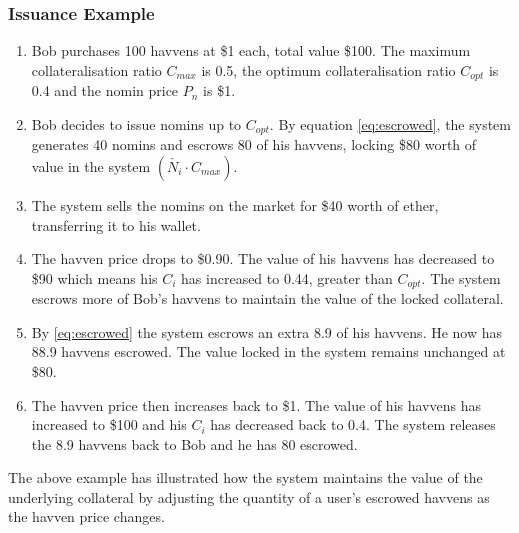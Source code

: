 \subsubsection{Issuance Example}

\begin{enumerate}
\item{Bob purchases 100 havvens at \$1 each, total value \$100. The maximum collateralisation ratio $C_{max}$ is 0.5, the optimum collateralisation ratio $C_{opt}$ is 0.4 and the nomin price $P_n$ is \$1.}
\item{Bob decides to issue nomins up to $C_{opt}$. By equation \eqref{eq:escrowed}, the system generates 40 nomins and escrows 80 of his havvens, locking \$80 worth of value in the system $ (\check{N_i} \cdot C_{max})$.}
\item{The system sells the nomins on the market for \$40 worth of ether, transferring it to his wallet}.
\item{The havven price drops to \$0.90. The value of his havvens has decreased to \$90 which means his $C_i$ has increased to 0.44, greater than $C_{opt}$. The system escrows more of Bob's havvens to maintain the value of the locked collateral.}
\item{By \eqref{eq:escrowed} the system escrows an extra 8.9 of his havvens. He now has 88.9 havvens escrowed. The value locked in the system remains unchanged at \$80.}
\item{The havven price then increases back to \$1. The value of his havvens has increased to \$100 and his $C_i$ has decreased back to 0.4. The system releases the 8.9 havvens back to Bob and he has 80 escrowed.}
\end{enumerate}

\noindent The above example has illustrated how the system maintains the value of the underlying collateral by adjusting the quantity of a user's escrowed havvens as the havven price changes.




